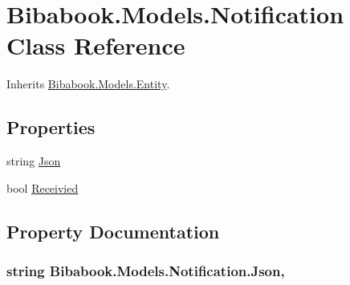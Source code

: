 \hypertarget{class_bibabook_1_1_models_1_1_notification}{}\section{Bibabook.\+Models.\+Notification Class Reference}
\label{class_bibabook_1_1_models_1_1_notification}


Inherits \hyperlink{class_bibabook_1_1_models_1_1_entity}{Bibabook.\+Models.\+Entity}.

\subsection*{Properties}
\begin{DoxyCompactItemize}
\item 
string \hyperlink{class_bibabook_1_1_models_1_1_notification_a0e561cce944c9b9d5f6a0d86966a799e}{Json}
\item 
bool \hyperlink{class_bibabook_1_1_models_1_1_notification_aac5ee5b41e74b1e70149b6605de8880c}{Receivied}
\end{DoxyCompactItemize}


\subsection{Property Documentation}
\hypertarget{class_bibabook_1_1_models_1_1_notification_a0e561cce944c9b9d5f6a0d86966a799e}{}
\subsubsection[{Json}]{\setlength{\rightskip}{0pt plus 5cm}string Bibabook.\+Models.\+Notification.\+Json\hspace{0.3cm}{\ttfamily [get]}, {\ttfamily [set]}}\label{class_bibabook_1_1_models_1_1_notification_a0e561cce944c9b9d5f6a0d86966a799e}
\hypertarget{class_bibabook_1_1_models_1_1_notification_aac5ee5b41e74b1e70149b6605de8880c}{}
